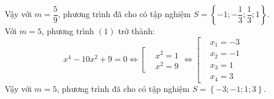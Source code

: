 \begin{ex}
{\begin{enumerate}[\bf 1)]
\begin{enumerate}[a)]
						Vậy với $m = \dfrac{5}{9}$, phương trình đã cho có tập nghiệm $S = \left\lbrace -1; -\dfrac{1}{3}; \dfrac{1}{3}; 1\right\rbrace$.\\
						Với $m = 5$, phương trình $(1)$ trở thành: $$x^4 - 10x^2 + 9 = 0 \Leftrightarrow \left[\begin{aligned} &x^2 = 1 \\ &x^2 = 9\end{aligned}\right. \Leftrightarrow \left[\begin{aligned} &x_1 = -3 \\ &x_2 = -1 \\ &x_3 = 1 \\ &x_4 = 3\end{aligned}\right.$$
						Vậy với $m = 5$, phương trình đã cho có tập nghiệm $S = \left\lbrace -3; -1; 1; 3\right\rbrace$.
			\end{enumerate}
\end{enumerate}
}
\end{ex}

